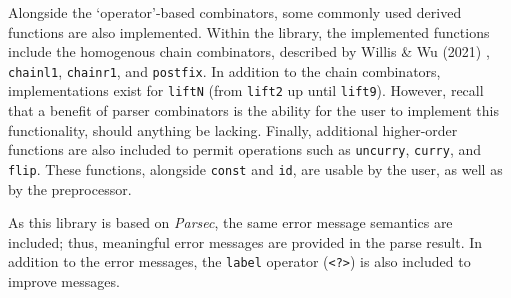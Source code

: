 Alongside the `operator'-based combinators, some commonly used derived functions are also implemented.
Within the library, the implemented functions include the homogenous chain combinators, described by Willis \& Wu (2021) \cite{willis21}, \texttt{chainl1}, \texttt{chainr1}, and \texttt{postfix}.
In addition to the chain combinators, implementations exist for \texttt{liftN} (from \texttt{lift2} up until \texttt{lift9}).
However, recall that a benefit of parser combinators is the ability for the user to implement this functionality, should anything be lacking.
Finally, additional higher-order functions are also included to permit operations such as \texttt{uncurry}, \texttt{curry}, and \texttt{flip}.
These functions, alongside \texttt{const} and \texttt{id}, are usable by the user, as well as by the preprocessor.

As this library is based on \textit{Parsec}, the same error message semantics are included; thus, meaningful error messages are provided in the parse result.
In addition to the error messages, the \texttt{label} operator (\texttt{<?>}) is also included to improve messages.